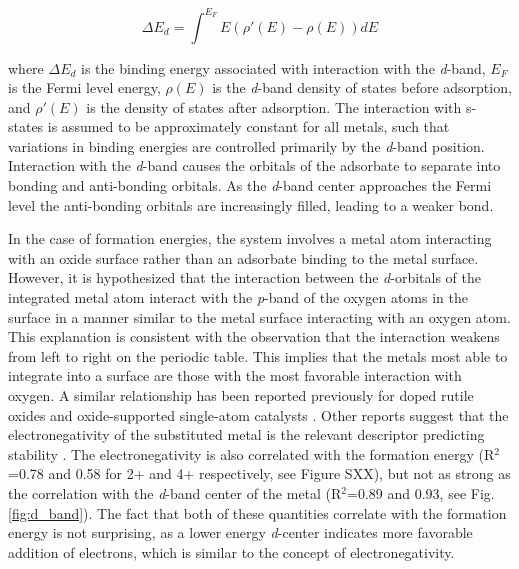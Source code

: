 \begin{equation}
    \Delta E_d = \int^{E_F} E(\rho'(E) - \rho(E))dE
    \label{eq:d_band}
\end{equation}

where $\Delta E_d$ is the binding energy associated with interaction with the \textit{d}-band, $E_F$ is the Fermi level energy, $\rho(E)$ is the \textit{d}-band density of states before adsorption, and $\rho'(E)$ is the density of states after adsorption. The interaction with s- states is assumed to be approximately constant for all metals, such that variations in binding energies are controlled primarily by the \textit{d}-band position. Interaction with the \textit{d}-band causes the orbitals of the adsorbate to separate into bonding and anti-bonding orbitals. As the \textit{d}-band center approaches the Fermi level the anti-bonding orbitals are increasingly filled, leading to a weaker bond.

In the case of formation energies, the system involves a metal atom interacting with an oxide surface rather than an adsorbate binding to the metal surface. However, it is hypothesized that the interaction between the \textit{d}-orbitals of the integrated metal atom interact with the \textit{p}-band of the oxygen atoms in the surface in a manner similar to the metal surface interacting with an oxygen atom. This explanation is consistent with the observation that the interaction weakens from left to right on the periodic table. This implies that the metals most able to integrate into a surface are those with the most favorable interaction with oxygen. A similar relationship has been reported previously for doped rutile oxides \cite{Xu_2015} and oxide-supported single-atom catalysts \cite{O_Connor_2018}. Other reports suggest that the electronegativity of the substituted metal is the relevant descriptor predicting stability \cite{Garc_a_Mota_2011}. The electronegativity is also correlated with the formation energy (R$^2$=0.78 and 0.58 for 2+ and 4+ respectively, see Figure SXX), but not as strong as the correlation with the \textit{d}-band center of the metal (R$^2$=0.89 and 0.93, see Fig. \ref{fig:d_band}). The fact that both of these quantities correlate with the formation energy is not surprising, as a lower energy \textit{d}-center indicates more favorable addition of electrons, which is similar to the concept of electronegativity. %


